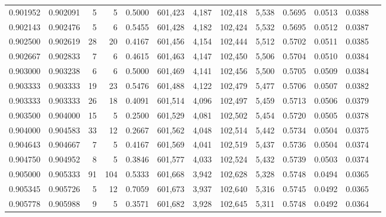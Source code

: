 \begin{tabular}{rrrrrrrrrrrrr}
0.901952 & 0.902091 &     5 &   5 &                                     0.5000 & 601,423 &   4,187 & 102,418 &   5,538 & 0.5695 & 0.0513 & 0.0388 \\
0.902143 & 0.902476 &     5 &   6 &                                     0.5455 & 601,428 &   4,182 & 102,424 &   5,532 & 0.5695 & 0.0512 & 0.0387 \\
0.902500 & 0.902619 &    28 &  20 &                                     0.4167 & 601,456 &   4,154 & 102,444 &   5,512 & 0.5702 & 0.0511 & 0.0385 \\
0.902667 & 0.902833 &     7 &   6 &                                     0.4615 & 601,463 &   4,147 & 102,450 &   5,506 & 0.5704 & 0.0510 & 0.0384 \\
0.903000 & 0.903238 &     6 &   6 &                                     0.5000 & 601,469 &   4,141 & 102,456 &   5,500 & 0.5705 & 0.0509 & 0.0384 \\
0.903333 & 0.903333 &    19 &  23 &                                     0.5476 & 601,488 &   4,122 & 102,479 &   5,477 & 0.5706 & 0.0507 & 0.0382 \\
0.903333 & 0.903333 &    26 &  18 &                                     0.4091 & 601,514 &   4,096 & 102,497 &   5,459 & 0.5713 & 0.0506 & 0.0379 \\
0.903500 & 0.904000 &    15 &   5 &                                     0.2500 & 601,529 &   4,081 & 102,502 &   5,454 & 0.5720 & 0.0505 & 0.0378 \\
0.904000 & 0.904583 &    33 &  12 &                                     0.2667 & 601,562 &   4,048 & 102,514 &   5,442 & 0.5734 & 0.0504 & 0.0375 \\
0.904643 & 0.904667 &     7 &   5 &                                     0.4167 & 601,569 &   4,041 & 102,519 &   5,437 & 0.5736 & 0.0504 & 0.0374 \\
0.904750 & 0.904952 &     8 &   5 &                                     0.3846 & 601,577 &   4,033 & 102,524 &   5,432 & 0.5739 & 0.0503 & 0.0374 \\
0.905000 & 0.905333 &    91 & 104 &                                     0.5333 & 601,668 &   3,942 & 102,628 &   5,328 & 0.5748 & 0.0494 & 0.0365 \\
0.905345 & 0.905726 &     5 &  12 &                                     0.7059 & 601,673 &   3,937 & 102,640 &   5,316 & 0.5745 & 0.0492 & 0.0365 \\
0.905778 & 0.905988 &     9 &   5 &                                     0.3571 & 601,682 &   3,928 & 102,645 &   5,311 & 0.5748 & 0.0492 & 0.0364 \\

\end{tabular}

